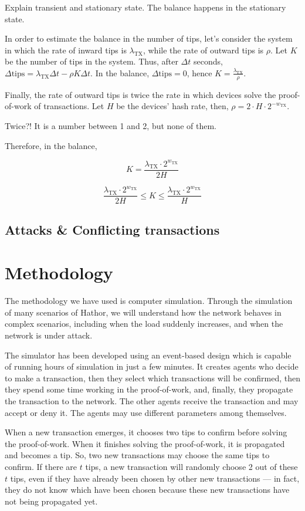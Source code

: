 Explain transient and stationary state. The balance happens in the stationary state.

In order to estimate the balance in the number of tips, let's consider the system in which the rate of inward tips is $\lambda_\text{TX}$, while the rate of outward tips is $\rho$. Let $K$ be the number of tips in the system. Thus, after $\Delta t$ seconds, $\Delta \text{tips} = \lambda_\text{TX} \Delta t - \rho K \Delta t$. In the balance, $\Delta \text{tips} = 0$, hence $K = \frac{\lambda_\text{TX}}{\rho}$.

Finally, the rate of outward tips is twice the rate in which devices solve the proof-of-work of transactions. Let $H$ be the devices' hash rate, then, $\rho = 2 \cdot H \cdot 2^{-w_\text{TX}}$.

Twice?! It is a number between 1 and 2, but none of them.

Therefore, in the balance,

$$K = \frac{\lambda_\text{TX} \cdot 2^{w_\text{TX}}}{2H}$$

$$\frac{\lambda_\text{TX} \cdot 2^{w_\text{TX}}}{2H} \le K \le \frac{\lambda_\text{TX} \cdot 2^{w_\text{TX}}}{H}$$


\section{Attacks \& Conflicting transactions}



\chapter{Methodology}

The methodology we have used is computer simulation. Through the simulation of many scenarios of Hathor, we will understand how the network behaves in complex scenarios, including when the load suddenly increases, and when the network is under attack.

The simulator has been developed using an event-based design which is capable of running hours of simulation in just a few minutes. It creates agents who decide to make a transaction, then they select which transactions will be confirmed, then they spend some time working in the proof-of-work, and, finally, they propagate the transaction to the network. The other agents receive the transaction and may accept or deny it. The agents may use different parameters among themselves.

When a new transaction emerges, it chooses two tips to confirm before solving the proof-of-work. When it finishes solving the proof-of-work, it is propagated and becomes a tip. So, two new transactions may choose the same tips to confirm. If there are $t$ tips, a new transaction will randomly choose 2 out of these $t$ tips, even if they have already been chosen by other new transactions --- in fact, they do not know which have been chosen because these new transactions have not being propagated yet.

